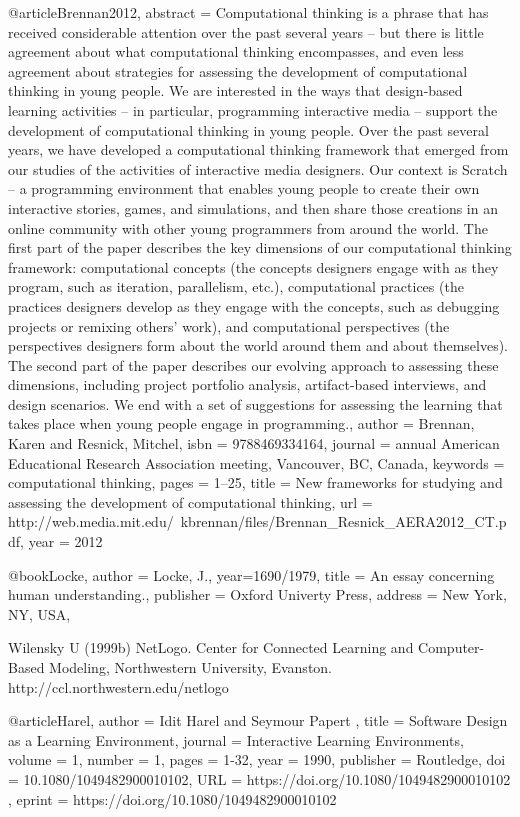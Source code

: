 @article{Brennan2012,
	abstract = {Computational thinking is a phrase that has received considerable attention over the past several years – but there is little agreement about what computational thinking encompasses, and even less agreement about strategies for assessing the development of computational thinking in young people. We are interested in the ways that design-based learning activities – in particular, programming interactive media – support the development of computational thinking in young people. Over the past several years, we have developed a computational thinking framework that emerged from our studies of the activities of interactive media designers. Our context is Scratch – a programming environment that enables young people to create their own interactive stories, games, and simulations, and then share those creations in an online community with other young programmers from around the world. The first part of the paper describes the key dimensions of our computational thinking framework: computational concepts (the concepts designers engage with as they program, such as iteration, parallelism, etc.), computational practices (the practices designers develop as they engage with the concepts, such as debugging projects or remixing others' work), and computational perspectives (the perspectives designers form about the world around them and about themselves). The second part of the paper describes our evolving approach to assessing these dimensions, including project portfolio analysis, artifact-based interviews, and design scenarios. We end with a set of suggestions for assessing the learning that takes place when young people engage in programming.},
	author = {Brennan, Karen and Resnick, Mitchel},
	isbn = {9788469334164},
	journal = {annual American Educational Research Association meeting, Vancouver, BC, Canada},
	keywords = {computational thinking},
	pages = {1--25},
	title = {{New frameworks for studying and assessing the development of computational thinking}},
	url = {http://web.media.mit.edu/{~}kbrennan/files/Brennan{\_}Resnick{\_}AERA2012{\_}CT.pdf},
	year = {2012}
}


@book{Locke,
	author = {Locke, J.},
	year={1690/1979},
	title = {An essay concerning human understanding.},
	publisher = {Oxford Univerty Press},
	address = {New York, NY, USA},
}

Wilensky U (1999b) NetLogo. Center for Connected Learning and Computer-Based Modeling, Northwestern University, Evanston. http://ccl.northwestern.edu/netlogo

@article{Harel,
	author = { Idit   Harel  and  Seymour   Papert },
	title = {Software Design as a Learning Environment},
	journal = {Interactive Learning Environments},
	volume = {1},
	number = {1},
	pages = {1-32},
	year  = {1990},
	publisher = {Routledge},
	doi = {10.1080/1049482900010102},
	URL = { 
		https://doi.org/10.1080/1049482900010102
	},
	eprint = { 
		https://doi.org/10.1080/1049482900010102
	}
}

